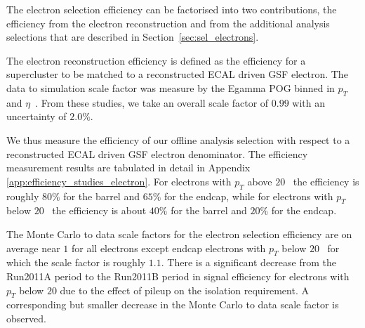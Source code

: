 
The electron selection efficiency can be factorised into two contributions,
the efficiency from the electron reconstruction and from the additional
analysis selections that are described in Section~\ref{sec:sel_electrons}.

The electron reconstruction efficiency is defined as the efficiency for a
supercluster to be matched to a reconstructed ECAL driven GSF electron.
The data to simulation scale factor was measure by the Egamma POG binned in
$p_T$ and $\eta$~\cite{ref:egamma_eff_gsf}. From these studies, we take an overall scale factor of
$0.99$ with an uncertainty of $2.0\%$.

We thus measure the efficiency of our offline analysis selection 
with respect to a reconstructed ECAL driven GSF electron denominator. 
The efficiency measurement results are tabulated in detail in Appendix 
\ref{app:efficiency_studies_electron}. For electrons with $p_{T}$ 
above $20$ \GeV\, the efficiency is roughly $80\%$ for the barrel and 
$65\%$ for the endcap, while for electrons with $p_{T}$ below $20$ \GeV\
the efficiency is about $40\%$ for the barrel and $20\%$ for the endcap.

The Monte Carlo to data scale factors for the electron selection efficiency are
on average near $1$ for all electrons except endcap electrons with $p_{T}$ 
below $20$ \GeV\ for which the scale factor is roughly $1.1$. There is a significant 
decrease from the Run2011A period to the Run2011B period
in signal efficiency for electrons with $p_{T}$ below $20$ \GeV due to the 
effect of pileup on the isolation requirement. A corresponding but smaller decrease 
in the Monte Carlo to data scale factor is observed. 



